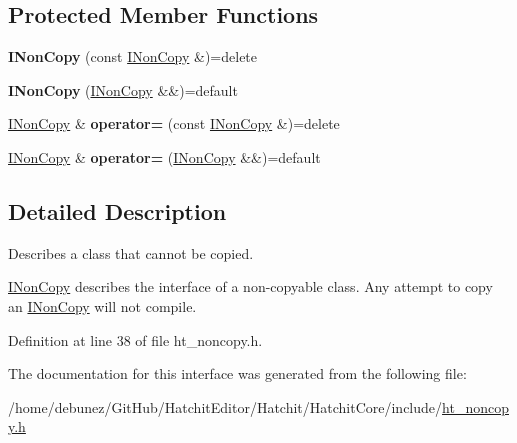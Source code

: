 \subsection*{Protected Member Functions}
\begin{DoxyCompactItemize}
\item 
{\bfseries I\+Non\+Copy} (const \hyperlink{classHatchit_1_1Core_1_1INonCopy}{I\+Non\+Copy} \&)=delete\hypertarget{classHatchit_1_1Core_1_1INonCopy_a1471227a7ef7a83b800bb27236efd6eb}{}\label{classHatchit_1_1Core_1_1INonCopy_a1471227a7ef7a83b800bb27236efd6eb}

\item 
{\bfseries I\+Non\+Copy} (\hyperlink{classHatchit_1_1Core_1_1INonCopy}{I\+Non\+Copy} \&\&)=default\hypertarget{classHatchit_1_1Core_1_1INonCopy_ab1ba3d28135e594ba7530de7b2369f23}{}\label{classHatchit_1_1Core_1_1INonCopy_ab1ba3d28135e594ba7530de7b2369f23}

\item 
\hyperlink{classHatchit_1_1Core_1_1INonCopy}{I\+Non\+Copy} \& {\bfseries operator=} (const \hyperlink{classHatchit_1_1Core_1_1INonCopy}{I\+Non\+Copy} \&)=delete\hypertarget{classHatchit_1_1Core_1_1INonCopy_a72dca01c3ab5356905dfa436da602673}{}\label{classHatchit_1_1Core_1_1INonCopy_a72dca01c3ab5356905dfa436da602673}

\item 
\hyperlink{classHatchit_1_1Core_1_1INonCopy}{I\+Non\+Copy} \& {\bfseries operator=} (\hyperlink{classHatchit_1_1Core_1_1INonCopy}{I\+Non\+Copy} \&\&)=default\hypertarget{classHatchit_1_1Core_1_1INonCopy_aa87747b247cf108d9c18e9ed7634493d}{}\label{classHatchit_1_1Core_1_1INonCopy_aa87747b247cf108d9c18e9ed7634493d}

\end{DoxyCompactItemize}


\subsection{Detailed Description}
Describes a class that cannot be copied. 

\hyperlink{classHatchit_1_1Core_1_1INonCopy}{I\+Non\+Copy} describes the interface of a non-\/copyable class. Any attempt to copy an \hyperlink{classHatchit_1_1Core_1_1INonCopy}{I\+Non\+Copy} will not compile. 

Definition at line 38 of file ht\+\_\+noncopy.\+h.



The documentation for this interface was generated from the following file\+:\begin{DoxyCompactItemize}
\item 
/home/debunez/\+Git\+Hub/\+Hatchit\+Editor/\+Hatchit/\+Hatchit\+Core/include/\hyperlink{ht__noncopy_8h}{ht\+\_\+noncopy.\+h}\end{DoxyCompactItemize}
